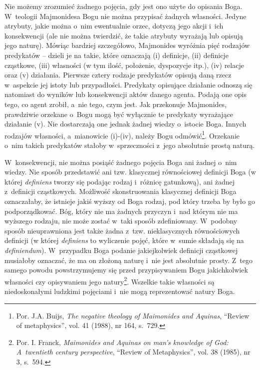 Nie możemy zrozumieć żadnego pojęcia, gdy jest ono użyte do opisania Boga. W~teologii Majmonidesa Bogu nie można przypisać żadnych własności. Jedyne atrybuty, jakie można o~nim ewentualnie orzec, dotyczą jego akcji i~ich konsekwencji (ale nie można twierdzić, że takie atrybuty wyrażają lub opisują jego naturę). Mówiąc bardziej szczegółowo, Majmonides wyróżnia pięć rodzajów predykatów -- dzieli je na takie, które oznaczają (i) definicje, (ii) definicje cząstkowe, (iii) własności (w tym ilość, położenie, dyspozycje itp.), (iv) relacje oraz (v) działania. Pierwsze cztery rodzaje predykatów opisują daną rzecz w~aspekcie jej istoty lub przypadłości. Predykaty opisujące działanie odnoszą się natomiast do wyników lub konsekwencji aktów danego agenta. Podają one opis tego, co agent zrobił, a~nie tego, czym jest. Jak przekonuje Majmonides, prawdziwie orzekane o~Bogu mogą być wyłącznie te predykaty wyrażające działanie (v). Nie dostarczają one jednak żadnej wiedzy o~istocie Boga. Innych rodzajów własności, a~mianowicie (i)-(iv), należy Bogu odmówić\footnote{Por. J.A. Buijs, \textit{The negative theology of Maimonides and Aquinas}, ``Review of metaphysics'', vol. 41 (1988), nr 164, s.~729.}. Orzekanie o~nim takich predykatów stałoby w~sprzeczności z~jego absolutnie prostą naturą.

W~konsekwencji, nie można posiąść żadnego pojęcia Boga ani żadnej o~nim wiedzy. Nie sposób przedstawić ani tzw. klasycznej równościowej definicji Boga (w której \textit{definiens} tworzy się podając rodzaj i~różnicę gatunkową), ani żadnej z~definicji cząstkowych. Możliwość skonstruowania klasycznej definicji Boga oznaczałaby, że istnieje jakiś wyższy od Boga rodzaj, pod który trzeba by było go podporządkować. Bóg, który nie ma żadnych przyczyn i~nad którym nie ma wyższego rodzaju, nie może zostać w~taki sposób zdefiniowany. W~podobny sposób nieuprawniona jest także żadna z~tzw. nieklasycznych równościowych definicji (w której \textit{definiens} to wyliczenie pojęć, które w~sumie składają się na \textit{definiendum}). W~przypadku Boga podanie jakiejkolwiek definicji cząstkowej musiałoby oznaczać, że ma on złożoną naturę i~nie jest absolutnie prosty. Z~tego samego powodu powstrzymujemy się przed przypisywaniem Bogu jakichkolwiek własności czy opisywaniem jego natury\footnote{Por. I. Franck, \textit{Maimonides and Aquinas on man's knowledge of God: A~twentieth century perspective}, ``Review of Metaphysics'', vol. 38 (1985), nr 3, s.~594.}. Wszelkie takie własności są niedoskonałymi ludzkimi pojęciami i~nie mogą reprezentować natury Boga.

